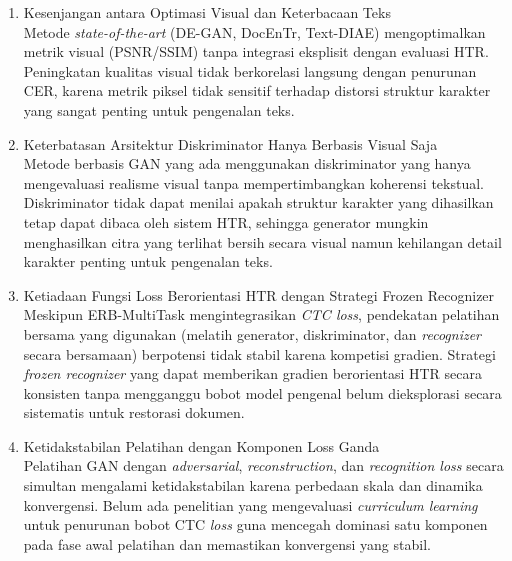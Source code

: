 \documentclass[12pt,a4paper]{article}
\begin{document}
\begin{enumerate}[label=\arabic*., leftmargin=0.5cm]
    \item Kesenjangan antara Optimasi Visual dan Keterbacaan Teks \\
    Metode \textit{state-of-the-art} (DE-GAN, DocEnTr, Text-DIAE) mengoptimalkan metrik visual (PSNR/SSIM) tanpa integrasi eksplisit dengan evaluasi HTR. Peningkatan kualitas visual tidak berkorelasi langsung dengan penurunan CER, karena metrik piksel tidak sensitif terhadap distorsi struktur karakter yang sangat penting untuk pengenalan teks.

    \item Keterbatasan Arsitektur Diskriminator Hanya Berbasis Visual Saja \\
    Metode berbasis GAN yang ada menggunakan diskriminator yang hanya mengevaluasi realisme visual tanpa mempertimbangkan koherensi tekstual. Diskriminator tidak dapat menilai apakah struktur karakter yang dihasilkan tetap dapat dibaca oleh sistem HTR, sehingga generator mungkin menghasilkan citra yang terlihat bersih secara visual namun kehilangan detail karakter penting untuk pengenalan teks.

    \item Ketiadaan Fungsi Loss Berorientasi HTR dengan Strategi Frozen Recognizer \\
    Meskipun ERB-MultiTask mengintegrasikan \textit{CTC loss}, pendekatan pelatihan bersama yang digunakan (melatih generator, diskriminator, dan \textit{recognizer} secara bersamaan) berpotensi tidak stabil karena kompetisi gradien. Strategi \textit{frozen recognizer} yang dapat memberikan gradien berorientasi HTR secara konsisten tanpa mengganggu bobot model pengenal belum dieksplorasi secara sistematis untuk restorasi dokumen.

    \item Ketidakstabilan Pelatihan dengan Komponen Loss Ganda \\
    Pelatihan GAN dengan \textit{adversarial}, \textit{reconstruction}, dan \textit{recognition loss} secara simultan mengalami ketidakstabilan karena perbedaan skala dan dinamika konvergensi. Belum ada penelitian yang mengevaluasi \textit{curriculum learning} untuk penurunan bobot CTC \textit{loss} guna mencegah dominasi satu komponen pada fase awal pelatihan dan memastikan konvergensi yang stabil.

\end{enumerate}
\end{document}
